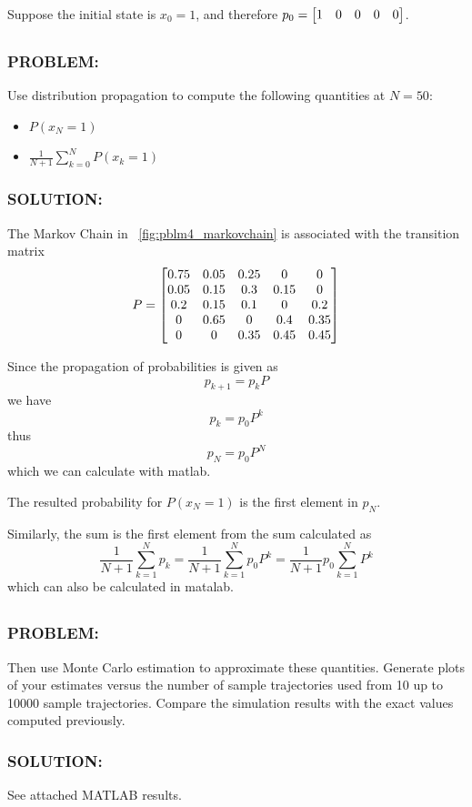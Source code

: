 \documentclass[]{article}
\newcommand{\Problem}{\subsubsection*{\textbf{PROBLEM:}}}
\newcommand{\Solution}{\subsubsection*{\textbf{SOLUTION:}}}
\begin{document}
Suppose the initial state is $x_0 = 1$, and therefore $p_0 = \mqty[1&0&0&0&0]$.

\subsection{}
\Problem
Use distribution propagation to compute the following quantities at $N = 50$:
\begin{itemize}
    \item $P(x_N = 1)$
    \item $\frac{1}{N+1} \sum_{k=0}^N P(x_k = 1)$
\end{itemize}

\Solution
The Markov Chain in \figurename \ \ref{fig:pblm4_markovchain} is associated with the transition matrix \[
    P = \mqty[
        0.75    &0.05   &0.25   &0      &0\\
        0.05    &0.15   &0.3    &0.15   &0\\
        0.2     &0.15   &0.1    &0      &0.2\\
        0       &0.65   &0      &0.4    &0.35\\
        0       &0      &0.35   &0.45   &0.45
    ]
\]

Since the propagation of probabilities is given as \[
    p_{k+1} = p_{k} P
\] we have \[
    p_{k} = p_0 P^{k}
\] thus \[
    p_{N} = p_0 P^{N} 
\] which we can calculate with matlab.

The resulted probability for $P(x_N = 1)$ is the first element in $p_{N}$.

Similarly, the sum is the first element from the sum calculated as \[
    \frac{1}{N+1} \sum_{k=1}^N p_k
    = \frac{1}{N+1} \sum_{k=1}^N p_0 P^{k}
    = \frac{1}{N+1} p_0 \sum_{k=1}^N P^{k}
\] which can also be calculated in matalab.

\subsection{}
\Problem
Then use Monte Carlo estimation to approximate these quantities.
Generate plots of your estimates versus the number of sample trajectories used from 10 up to 10000 sample trajectories.
Compare the simulation results with the exact values computed previously.
\Solution

See attached MATLAB results.

\newpage
% 





% 
% 
\end{document}
